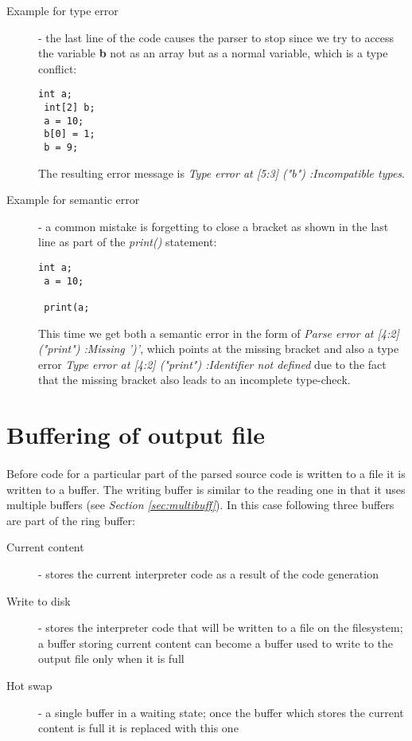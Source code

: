     		\begin{description}
    			\item[Example for type error] - the last line of the code causes the parser to stop since we try to access the variable \textbf{b} not as an array but as a normal variable, which is a type conflict:
    				\begin{lstlisting}[frame=single]
 int a;
 int[2] b;
 a = 10;
 b[0] = 1;
 b = 9;
				\end{lstlisting}
			The resulting error message is \textit{Type error at [5:3] ("b") :Incompatible types}.
			\item[Example for semantic error] - a common mistake is forgetting to close a bracket as shown in the last line as part of the \textit{print()} statement:
			\begin{lstlisting}[frame=single]
 int a;
 a = 10;
 
 print(a;
			\end{lstlisting}
			This time we get both a semantic error in the form of \textit{Parse error at [4:2] ("print") :Missing ')'}, which points at the missing bracket and also a type error \textit{Type error at [4:2] ("print") :Identifier not defined} due to the fact that the missing bracket also leads to an incomplete type-check.

    		\end{description}
    		    		
    	\section{Buffering of output file}
    	\label{sec:bufferout}
  	\paragraph{}
  		Before code for a particular part of the parsed source code is written to a file it is written to a buffer. The writing buffer is similar to the reading one in that it uses multiple buffers (see \textit{Section \ref{sec:multibuff}}). In this case following three buffers are part of the ring buffer:
  		\begin{description}
  			\item[Current content] - stores the current interpreter code as a result of the code generation
  			\item[Write to disk] - stores the interpreter code that will be written to a file on the filesystem; a buffer storing current content can become a buffer used to write to the output file only when it is full
  			\item[Hot swap] - a single buffer in a waiting state; once the buffer which stores the current content is full it is replaced with this one
  		\end{description}

